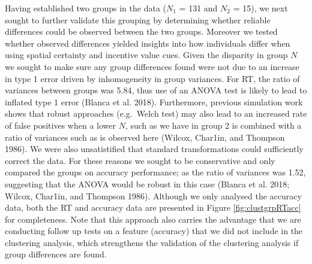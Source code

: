 \documentclass[11pt,halfline,a4paper,]{ouparticle}
\begin{document}
Having established two groups in the data (\(N_{1}\) = 131 and \(N_{2}\) = 15), we next sought to further validate this grouping by determining whether reliable differences could be observed between the two groups. Moreover we tested whether observed differences yielded insights into how individuals differ when using spatial certainty and incentive value cues. Given the disparity in group \(N\) we sought to make sure any group differences found were not due to an increase in type 1 error driven by inhomogeneity in group variances. For RT, the ratio of variances between groups was 5.84, thus use of an ANOVA test is likely to lead to inflated type 1 error (Blanca et al. 2018). Furthermore, previous simulation work shows that robust approaches (e.g.~Welch test) may also lead to an increased rate of false positives when a lower \(N\), such as we have in group 2 is combined with a ratio of variances such as is observed here (Wilcox, Char1in, and Thompson 1986). We were also unsatistified that standard transformations could sufficiently correct the data. For these reasons we sought to be conservative and only compared the groups on accuracy performance; as the ratio of variances was 1.52, suggesting that the ANOVA would be robust in this case (Blanca et al. 2018; Wilcox, Char1in, and Thompson 1986). Although we only analysed the accuracy data, both the RT and accuracy data are presented in Figure \ref{fig:clustgrpRTacc} for completeness. Note that this approach also carries the advantage that we are conducting follow up tests on a feature (accuracy) that we did not include in the clustering analysis, which strengthens the validation of the clustering analysis if group differences are found.
\end{document}
